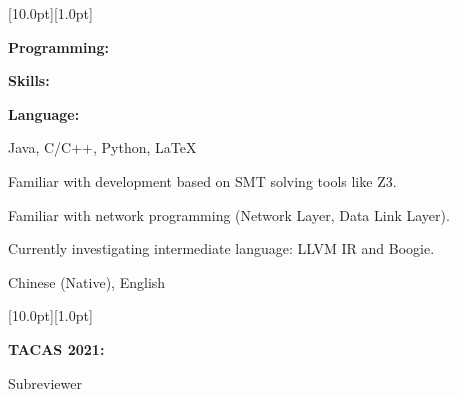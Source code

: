 \documentclass[12pt,a4paper,utf8]{report}
\begin{document}
\begin{minipage}[t]{16cm}
    \colorbox{subtitlecolor}{\raisebox{0pt}[10.0pt][1.0pt]{
        \textcolor{white}{\textsf{}}}}
\end{minipage}\par
\vspace{0.2cm}
    \begin{minipage}[t]{4cm}
        \qquad \textbf{Programming:}\par
        \qquad \textbf{Skills:}\par
        \qquad \par
        \qquad \par
        \qquad \textbf{Language:}\par
    \end{minipage}
    \begin{minipage}[t]{14cm}
        Java, C/C++, Python, \LaTeX \par
       	Familiar with development based on SMT solving tools like \textsc{Z3}.\par
       	Familiar with network programming (Network Layer, Data Link Layer). \par
       	Currently investigating intermediate language: LLVM IR and Boogie. \par
        Chinese (Native), English \par
    \end{minipage}\par
\vspace{0.4cm}

\begin{minipage}[t]{16cm}
    \colorbox{subtitlecolor}{\raisebox{0pt}[10.0pt][1.0pt]{
        \textcolor{white}{\textsf{}}}}
\end{minipage}\par


\vspace{0.2cm}
    \begin{minipage}[t]{4cm}
        \qquad \textbf{TACAS 2021: }\par
    \end{minipage}
    \begin{minipage}[t]{14cm}
        Subreviewer\par
    \end{minipage}\par
\vspace{0.4cm}
\end{document}
